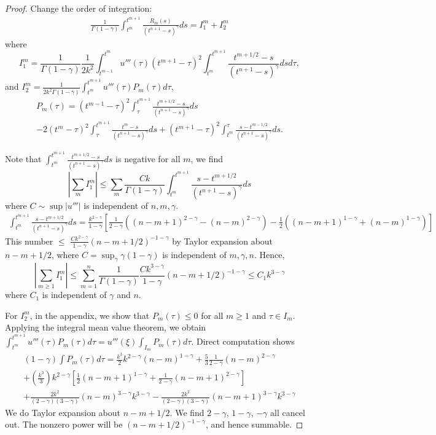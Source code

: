 \documentclass[11pt]{article}
\begin{document}
\begin{proof}
Change the order of integration: 
\begin{gather*}
\frac{1}{\Gamma(1-\gamma)}\int_{t^m}^{t^{m+1}}\frac{R_m(s)}{(t^{n+1}-s)^{\gamma}}ds=I_1^m+I_2^m
\end{gather*}
where $$
I_1^m=\frac{1}{\Gamma(1-\gamma)}\frac{1}{2k^2}\int_{t^{m-1}}^{t^{m}}
u'''(\tau)(t^{m+1}-\tau)^2\int_{t^m}^{t^{m+1}}\frac{t^{m+1/2}-s}{(t^{n+1}-s)^{\gamma}}dsd\tau,
$$
and $I_2^m=\frac{1}{2k^2\Gamma(1-\gamma)}\int_{t^m}^{t^{m+1}}u'''(\tau)P_m(\tau)d\tau$,
\begin{multline*}
P_m(\tau)=(t^{m-1}-\tau)^2\int_{\tau}^{t^{m+1}}\frac{t^{m+1/2}-s}{(t^{n+1}-s)^{\gamma}}ds\\
-2(t^m-\tau)^2\int_{\tau}^{t^{m+1}}\frac{t^{m}-s}{(t^{n+1}-s)^{\gamma}}ds
+(t^{m+1}-\tau)^2\int_{t^m}^{\tau}\frac{s-t^{m-1/2}}{(t^{n+1}-s)^{\gamma}}ds.
\end{multline*}

Note that $\int_{t^m}^{t^{m+1}}\frac{t^{m+1/2}-s}{(t^{n+1}-s)^{\gamma}}ds$
is negative for all $m$, we find $$
|\sum_m I_1^m|\le \sum_m \frac{Ck}{\Gamma(1-\gamma)}\int_{t^m}^{t^{m+1}}\frac{s-t^{m+1/2}}{(t^{n+1}-s)^{\gamma}}ds
$$
where $C\sim \sup|u'''|$ is independent of $n,m,\gamma$.
\begin{multline*}
\int_{t^m}^{t^{m+1}}\frac{s-t^{m+1/2}}{(t^{n+1}-s)^{\gamma}}ds
=\frac{k^{2-\gamma}}{1-\gamma}[
\frac{1}{2-\gamma}((n-m+1)^{2-\gamma}-(n-m)^{2-\gamma})
-\frac{1}{2}((n-m+1)^{1-\gamma}+(n-m)^{1-\gamma})]
\end{multline*}
This number $\le$ $\frac{Ck^{2-\gamma}}{1-\gamma}(n-m+1/2)^{-1-\gamma}$ by Taylor expansion about $n-m+1/2$, where $C=\sup_{\gamma}\gamma(1-\gamma)$ is independent of $m,\gamma, n$. Hence, $$
|\sum_{m\ge 1} I_1^m|\le \sum_{m=1}^n
\frac{1}{\Gamma(1-\gamma)}\frac{Ck^{3-\gamma}}{1-\gamma}(n-m+1/2)^{-1-\gamma}\le C_1k^{3-\gamma}
$$
where $C_1$ is independent of $\gamma$ and $n$.

For $I_2^m$, in the appendix, we show that $P_m(\tau)\le 0$ for all $m\ge 1$ and $\tau\in I_m$. Applying the integral mean value theorem, we obtain  $\int_{t^m}^{t^{m+1}}u'''(\tau)P_m(\tau)d\tau
=u'''(\xi) \int_{I_m}P_m(\tau)d\tau$. Direct computation shows
\begin{multline*}
(1-\gamma)\int P_m(\tau)d\tau=\frac{k^3}{2}k^{2-\gamma}(n-m)^{1-\gamma}+
\frac{5}{3}\frac{1}{2-\gamma}(n-m)^{2-\gamma}\\
+(\frac{k^3}{3})k^{2-\gamma}[\frac{1}{2}(n-m+1)^{1-\gamma}+\frac{1}{2-\gamma}(n-m+1)^{2-\gamma}]\\
+\frac{2k^2}{(2-\gamma)(3-\gamma)}(n-m)^{3-\gamma}k^{3-\gamma}
-\frac{2k^2}{(2-\gamma)(3-\gamma)}(n-m+1)^{3-\gamma}k^{3-\gamma}
\end{multline*}
We do Taylor expansion about $n-m+1/2$. We find $2-\gamma$, $1-\gamma$, $-\gamma$ all cancel out. 
The nonzero power will be $(n-m+1/2)^{-1-\gamma}$, and hence summable.


\end{proof}
\end{document}
